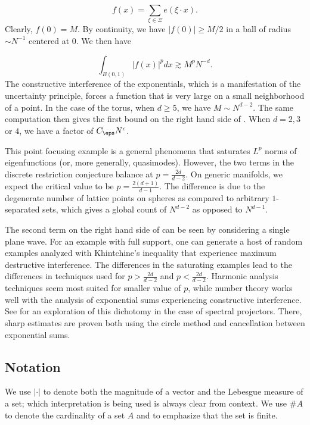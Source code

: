 \documentclass[11pt]{amsart}
\begin{document}
\begin{equation*}
    f(x) = \sum_{\xi\in \Xi}e(\xi \cdot x).
\end{equation*}
Clearly, $f(0)=M$. By continuity, we have $|f(0)|\geq M/2$ in a ball of radius $\sim N^{-1}$ centered at $0$. We then have

\begin{equation*}
    \int_{B(0,1)}|f(x)|^pdx \gtrsim M^pN^{-d}.
\end{equation*}
The constructive interference of the exponentials, which is a manifestation of the uncertainty principle, forces a function that is very large on a small neighborhood of a point. In the case of the torus, when $d\geq 5$, we have $M\sim N^{d-2}$. The same computation then gives the first bound on the right hand side of . When $d=2,3$ or $4$, we have a factor of $C_\eps N^\epsilon$.

This point focusing example is a general phenomena that saturates $L^p$ norms of eigenfunctions (or, more generally, quasimodes). However, the two terms in the discrete restriction conjecture balance at $p=\frac{2d}{d-2}$. On generic manifolds, we expect the critical value to be $p=\frac{2(d+1)}{d-1}$. The difference is due to the degenerate number of lattice points on spheres as compared to arbitrary $1$-separated sets, which gives a global count of $N^{d-2}$ as opposed to $N^{d-1}$.

The second term on the right hand side of  can be seen by considering a single plane wave. For an example with full support, one can generate a host of random examples analyzed with Khintchine's inequality that experience maximum destructive interference. The differences in the saturating examples lead to the differences in techniques used for $p>\frac{2d}{d-2}$ and $p<\frac{2d}{d-2}$. Harmonic analysis techniques seem most suited for smaller value of $p$, while number theory works well with the analysis of exponential sums experiencing constructive interference. See \cite{GermainMyersonPezzi} for an exploration of this dichotomy in the case of spectral projectors. There, sharp estimates are proven both using the circle method and cancellation between exponential sums.


\subsection{Notation}\label{1: Subsection Notation}
We use $|\cdot|$ to denote both the magnitude of a vector and the Lebesgue measure of a set; which interpretation is being used is always clear from context. We use $\#A$ to denote the cardinality of a set $A$ and to emphasize that the set is finite.
\end{document}
